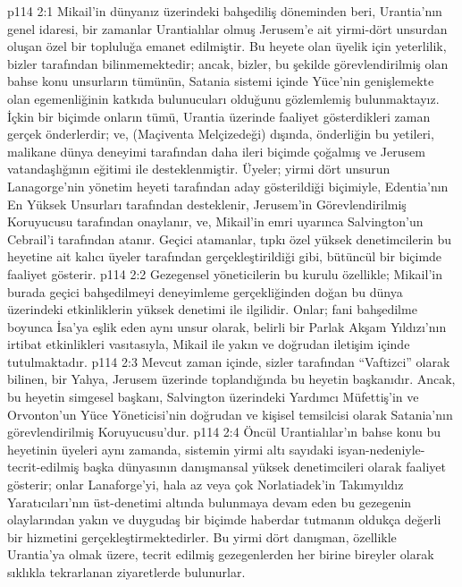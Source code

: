 \vs p114 2:1 Mikail’in dünyanız üzerindeki bahşediliş döneminden beri, Urantia’nın genel idaresi, bir zamanlar Urantialılar olmuş Jerusem’e ait yirmi\hyp{}dört unsurdan oluşan özel bir topluluğa emanet edilmiştir. Bu heyete olan üyelik için yeterlilik, bizler tarafından bilinmemektedir; ancak, bizler, bu şekilde görevlendirilmiş olan bahse konu unsurların tümünün, Satania sistemi içinde Yüce’nin genişlemekte olan egemenliğinin katkıda bulunucuları olduğunu gözlemlemiş bulunmaktayız. İçkin bir biçimde onların tümü, Urantia üzerinde faaliyet gösterdikleri zaman gerçek önderlerdir; ve, (Maçiventa Melçizedeği) dışında, önderliğin bu yetileri, malikane dünya deneyimi tarafından daha ileri biçimde çoğalmış ve Jerusem vatandaşlığının eğitimi ile desteklenmiştir. Üyeler; yirmi dört unsurun Lanagorge’nin yönetim heyeti tarafından aday gösterildiği biçimiyle, Edentia’nın En Yüksek Unsurları tarafından desteklenir, Jerusem’in Görevlendirilmiş Koruyucusu tarafından onaylanır, ve, Mikail’in emri uyarınca Salvington’un Cebrail’i tarafından atanır. Geçici atamanlar, tıpkı özel yüksek denetimcilerin bu heyetine ait kalıcı üyeler tarafından gerçekleştirildiği gibi, bütüncül bir biçimde faaliyet gösterir.
\vs p114 2:2 Gezegensel yöneticilerin bu kurulu özellikle; Mikail’in burada geçici bahşedilmeyi deneyimleme gerçekliğinden doğan bu dünya üzerindeki etkinliklerin yüksek denetimi ile ilgilidir. Onlar; fani bahşedilme boyunca İsa’ya eşlik eden aynı unsur olarak, belirli bir Parlak Akşam Yıldızı’nın irtibat etkinlikleri vasıtasıyla, Mikail ile yakın ve doğrudan iletişim içinde tutulmaktadır.
\vs p114 2:3 Mevcut zaman içinde, sizler tarafından “Vaftizci” olarak bilinen, bir Yahya, Jerusem üzerinde toplandığında bu heyetin başkanıdır. Ancak, bu heyetin simgesel başkanı, Salvington üzerindeki Yardımcı Müfettiş’in ve Orvonton’un Yüce Yöneticisi’nin doğrudan ve kişisel temsilcisi olarak Satania’nın görevlendirilmiş Koruyucusu’dur.
\vs p114 2:4 Öncül Urantialılar’ın bahse konu bu heyetinin üyeleri aynı zamanda, sistemin yirmi altı sayıdaki isyan\hyp{}nedeniyle\hyp{}tecrit\hyp{}edilmiş başka dünyasının danışmansal yüksek denetimcileri olarak faaliyet gösterir; onlar Lanaforge’yi, hala az veya çok Norlatiadek’in Takımyıldız Yaratıcıları’nın üst\hyp{}denetimi altında bulunmaya devam eden bu gezegenin olaylarından yakın ve duygudaş bir biçimde haberdar tutmanın oldukça değerli bir hizmetini gerçekleştirmektedirler. Bu yirmi dört danışman, özellikle Urantia’ya olmak üzere, tecrit edilmiş gezegenlerden her birine bireyler olarak sıklıkla tekrarlanan ziyaretlerde bulunurlar.

